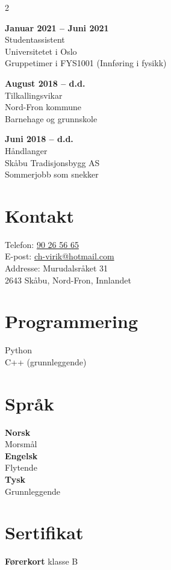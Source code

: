 \documentclass[a4paper,10pt]{article}
\begin{document}
\begin{paracol}{2}
\vspace{0.3cm}

\textbf{Januar 2021 -- Juni 2021} \\
Studentassistent \\
Universitetet i Oslo \\
Gruppetimer i FYS1001 (Innføring i fysikk)

\vspace{0.3cm}

\textbf{August 2018 -- d.d.} \\
Tilkallingsvikar \\
Nord-Fron kommune \\
Barnehage og grunnskole

\vspace{0.3cm}

\textbf{Juni 2018 -- d.d.} \\
Håndlanger \\
Skåbu Tradisjonsbygg AS \\
Sommerjobb som snekker

\switchcolumn

\section*{Kontakt}
Telefon: \href{tel:+4790265665}{90 26 56 65}\\
E-post: \href{mailto:ch-virik@hotmail.com}{ch-virik@hotmail.com}\\
Addresse: Murudalsråket 31 \\
2643 Skåbu, Nord-Fron, Innlandet

\section*{Programmering}
Python \\
C++ (grunnleggende)

\section*{Språk}
\textbf{Norsk} \\
Morsmål\\

\textbf{Engelsk} \\
Flytende\\

\textbf{Tysk} \\
Grunnleggende

\section*{Sertifikat}
\textbf{Førerkort} klasse B


\end{paracol}
\end{document}
